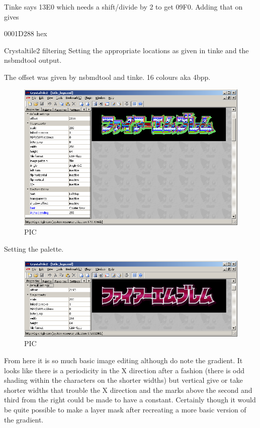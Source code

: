 \documentclass[
]{book}
\begin{document}
Tinke says 13E0 which needs a shift/divide by 2 to get 09F0. Adding that on gives

0001D288 hex

Crystaltile2 filtering Setting the appropriate locations as given in tinke and the nsbmdtool output.

The offset was given by nsbmdtool and tinke. 16 colours aka 4bpp.

\begin{figure}
\centering
\includegraphics{images/75_home_fast6191_romhackingguide_unrenamed_file___gguidegraphics3dminorNSMBDtexturedecoding_6.png}
\caption{PIC}
\end{figure}

Setting the palette.

\begin{figure}
\centering
\includegraphics{images/76_home_fast6191_romhackingguide_unrenamed_file___degraphics3dminorNSMBDtexturedecoding_6_pal.png}
\caption{PIC}
\end{figure}

From here it is so much basic image editing although do note the gradient. It looks like there is a periodicity in the X direction after a fashion (there is odd shading within the characters on the shorter widths) but vertical give or take shorter widths that trouble the X direction and the marks above the second and third from the right could be made to have a constant. Certainly though it would be quite possible to make a layer mask after recreating a more basic version of the gradient.
\end{document}
